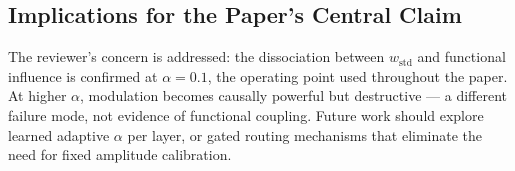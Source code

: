 \subsection{Implications for the Paper's Central Claim}

The reviewer's concern is addressed: the dissociation between $w_{\mathrm{std}}$ and
functional influence is confirmed at $\alpha=0.1$, the operating point used throughout
the paper. At higher $\alpha$, modulation becomes causally powerful but
destructive --- a different failure mode, not evidence of functional coupling.
Future work should explore learned adaptive $\alpha$ per layer, or gated routing
mechanisms that eliminate the need for fixed amplitude calibration.

